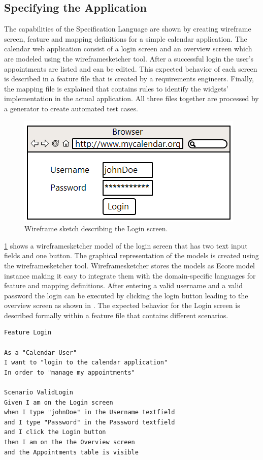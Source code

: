 \documentclass{sig-alternate-05-2015}
\begin{document}
\subsection{Specifying the Application}\label{sec:SpecifyingTheApplication} 
The capabilities of the Specification Language are shown by creating wireframe screen, feature and mapping definitions for a simple calendar application.
The calendar web application consist of a login screen and an overview screen which are modeled using the wireframesketcher tool.
After a successful login the user's appointments are listed and can be edited.
This expected behavior of each screen is described in a feature file that is created by a requirements engineers.
Finally, the mapping file is explained that contains rules to identify the widgets' implementation in the actual application.
All three files together are processed by a generator to create automated test cases.

\begin{figure}[h]
	\centering
	\includegraphics[width=0.8\linewidth]{Login.png}
	\caption{Wireframe sketch describing the Login screen.}
	\label{fig:login}
\end{figure}

\cref{fig:login} shows a wireframesketcher model of the login screen that has two text input fields and one button.
The graphical representation of the models is created using the wireframesketcher tool.
Wireframesketcher stores the models as Ecore model instance making it easy to integrate them with the domain-specific languages for feature and mapping definitions.
After entering a valid username and a valid password the login can be executed by clicking the login button leading to the overview screen as shown in .
The expected behavior for the Login screen is described formally within a feature file that contains different scenarios.

\begin{lstlisting}[captionpos=b, caption=Feature Description: Login Screen., label={lst:featureLogin}, language=dsl]
Feature Login

As a "Calendar User"
I want to "login to the calendar application"
In order to "manage my appointments"

Scenario ValidLogin
Given I am on the Login screen 
when I type "johnDoe" in the Username textfield 
and I type "Password" in the Password textfield 
and I click the Login button
then I am on the the Overview screen
and the Appointments table is visible
\end{lstlisting}
\end{document}
